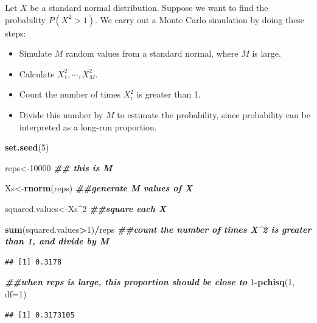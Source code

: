 \documentclass[
]{book}
\newenvironment{Shaded}{\begin{snugshade}}{\end{snugshade}}
\newcommand{\AttributeTok}[1]{\textcolor[rgb]{0.13,0.29,0.53}{#1}}
\newcommand{\DecValTok}[1]{\textcolor[rgb]{0.00,0.00,0.81}{#1}}
\newcommand{\DocumentationTok}[1]{\textcolor[rgb]{0.56,0.35,0.01}{\textbf{\textit{#1}}}}
\newcommand{\FunctionTok}[1]{\textcolor[rgb]{0.13,0.29,0.53}{\textbf{#1}}}
\newcommand{\NormalTok}[1]{#1}
\newcommand{\OtherTok}[1]{\textcolor[rgb]{0.56,0.35,0.01}{#1}}
\newcommand{\SpecialCharTok}[1]{\textcolor[rgb]{0.81,0.36,0.00}{\textbf{#1}}}
\providecommand{\tightlist}{%
  \setlength{\itemsep}{0pt}\setlength{\parskip}{0pt}}
\begin{document}
Let \(X\) be a standard normal distribution. Suppose we want to find the probability \(P(X^2 > 1)\). We carry out a Monte Carlo simulation by doing these steps:

\begin{itemize}
\tightlist
\item
  Simulate \(M\) random values from a standard normal, where \(M\) is large.
\item
  Calculate \(X_1^2, \cdots, X_M^2\).
\item
  Count the number of times \(X_i^2\) is greater than 1.
\item
  Divide this number by \(M\) to estimate the probability, since probability can be interpreted as a long-run proportion.
\end{itemize}

\begin{Shaded}
\begin{Highlighting}[]
\FunctionTok{set.seed}\NormalTok{(}\DecValTok{5}\NormalTok{)}

\NormalTok{reps}\OtherTok{\textless{}{-}}\DecValTok{10000} \DocumentationTok{\#\# this is M}

\NormalTok{Xs}\OtherTok{\textless{}{-}}\FunctionTok{rnorm}\NormalTok{(reps) }\DocumentationTok{\#\#generate M values of X}

\NormalTok{squared.values}\OtherTok{\textless{}{-}}\NormalTok{Xs}\SpecialCharTok{\^{}}\DecValTok{2} \DocumentationTok{\#\#square each X}

\FunctionTok{sum}\NormalTok{(squared.values}\SpecialCharTok{\textgreater{}}\DecValTok{1}\NormalTok{)}\SpecialCharTok{/}\NormalTok{reps }\DocumentationTok{\#\#count the number of times X\^{}2 is greater than 1, and divide by M}
\end{Highlighting}
\end{Shaded}

\begin{verbatim}
## [1] 0.3178
\end{verbatim}

\begin{Shaded}
\begin{Highlighting}[]
\DocumentationTok{\#\#when reps is large, this proportion should be close to}
\DecValTok{1}\SpecialCharTok{{-}}\FunctionTok{pchisq}\NormalTok{(}\DecValTok{1}\NormalTok{, }\AttributeTok{df=}\DecValTok{1}\NormalTok{)}
\end{Highlighting}
\end{Shaded}

\begin{verbatim}
## [1] 0.3173105
\end{verbatim}
\end{document}
